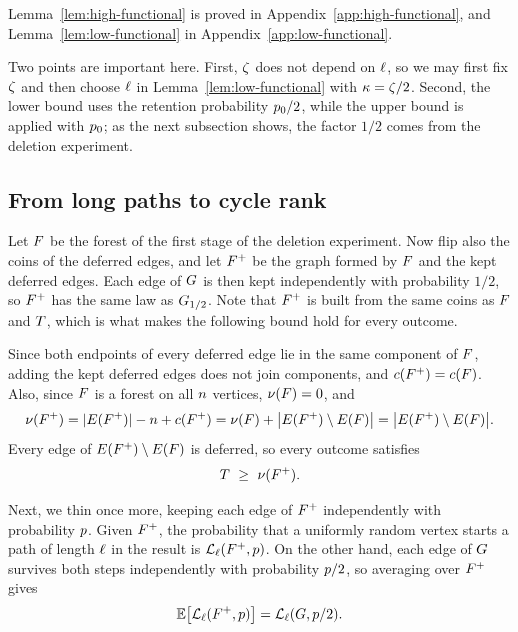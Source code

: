 Lemma~\ref{lem:high-functional} is proved in
Appendix~\ref{app:high-functional}, and Lemma~\ref{lem:low-functional} in
Appendix~\ref{app:low-functional}.

Two points are important here. First, \(\zeta\) does not depend on \(\ell\),
so we may first fix \(\zeta\) and then choose \(\ell\) in
Lemma~\ref{lem:low-functional} with \(\kappa=\zeta/2\). Second, the lower bound
uses the retention probability \(p_0/2\), while the upper bound is applied
with \(p_0\); as the next subsection shows, the factor \(1/2\) comes from
the deletion experiment.

\subsection{From long paths to cycle rank}\label{subsec:long-to-cycle}

Let \(F\) be the forest of the first stage of the deletion experiment. Now
flip also the coins of the deferred edges, and let \({F^{+}}\) be the graph
formed by \(F\) and the kept deferred edges. Each edge of \(G\) is then
kept independently with probability \(1/2\), so \({F^{+}}\) has the same law as
\(G_{1/2}\). Note that \({F^{+}}\) is built from the same coins as
\(F\) and \(T\), which is what makes the following bound hold for every
outcome.

Since both endpoints of every
deferred edge lie in the same component of \(F\), adding the kept deferred
edges does not join components, and \(c({F^{+}})=c(F)\). Also,
since \(F\) is a forest on all \(n\) vertices, \(\nu(F)=0\),
and
\[
  \nu({F^{+}})=|E({F^{+}})|-n+c({F^{+}})
  =\nu(F)+\bigl|E({F^{+}})\setminus E(F)\bigr|
  =\bigl|E({F^{+}})\setminus E(F)\bigr| .
\]
Every edge of \(E({F^{+}})\setminus E(F)\) is deferred, so every outcome
satisfies
\begin{equation}\label{eq:T-nu}
  T\ \ge\ \nu({F^{+}}) .
\end{equation}

Next, we thin once more, keeping each edge of \({F^{+}}\) independently with
probability \(p\). Given \({F^{+}}\), the probability that a uniformly
random vertex starts a path of length \(\ell\) in the result is
\(\mathcal{L}_{\ell}({F^{+}},p)\). On the other hand, each edge of \(G\)
survives both steps independently with probability \(p/2\), so averaging
over \({F^{+}}\) gives
\begin{equation}\label{eq:two-stage-functional}
  \Ex{\Lpath{\plen}{\Akept}{\keepp}}
  =\Lpath{\plen}{\Gin}{\keepp/2} .
\end{equation}

